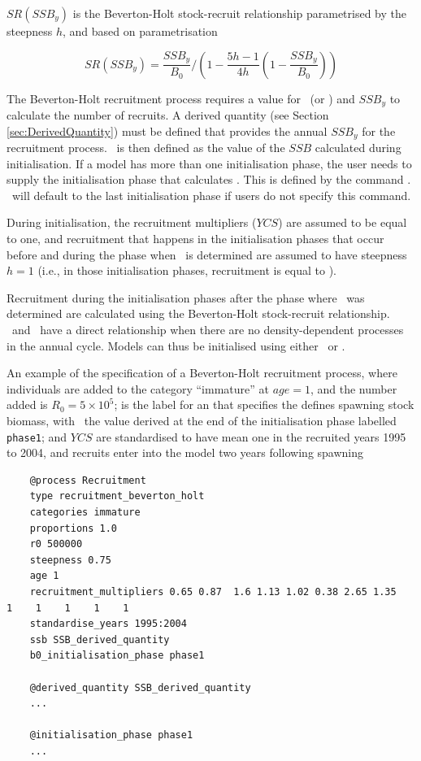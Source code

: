 $SR(SSB_y)$ is the Beverton-Holt stock-recruit relationship parametrised by the steepness $h$, and based on \cite{mace_doonan_88} parametrisation

\begin{equation}\label{eq:BH_SR}
SR(SSB_y) = \frac{SSB_y}{B_0} / \left( 1-\frac{5h-1}{4h} \left( 1-\frac{SSB_y}{B_0} \right) \right)
\end{equation}

The Beverton-Holt recruitment process requires a value for \Bzero\ (or \Rzero) and $SSB_y$ to calculate the number of recruits. A derived quantity (see Section \ref{sec:DerivedQuantity}) must be defined that provides the annual $SSB_y$ for the recruitment process. \Bzero\ is then defined as the value of the $SSB$ calculated during initialisation. If a model has more than one initialisation phase, the user needs to supply the initialisation phase that calculates \Bzero. This is defined by the command . \CNAME\ will default to the last initialisation phase if users do not specify this command.

During initialisation, the recruitment multipliers ($YCS$) are assumed to be equal to one, and recruitment that happens in the initialisation phases that occur before and during the phase when \Bzero\ is determined are assumed to have steepness $h=1$ (i.e., in those initialisation phases, recruitment is equal to \Rzero).

Recruitment during the initialisation phases after the phase where \Bzero\ was determined are calculated using the Beverton-Holt stock-recruit relationship. \Rzero\ and \Bzero\ have a direct relationship when there are no density-dependent processes in the annual cycle. Models can thus be initialised using either \Bzero\ or \Rzero.

An example of the specification of a Beverton-Holt recruitment process, where individuals are added to the category \enquote{immature} at $age=1$, and the number added is $R_0=5 \times 10^5$;  is the label for an  that specifies the defines spawning stock biomass, with \Bzero\ the value derived at the end of the initialisation phase labelled \texttt{phase1}; and $YCS$ are standardised to have mean one in the recruited years 1995 to 2004, and recruits enter into the model two years following spawning

{\small{\begin{verbatim}
	@process Recruitment
	type recruitment_beverton_holt
	categories immature
	proportions 1.0
	r0 500000
	steepness 0.75
	age 1
	recruitment_multipliers 0.65 0.87  1.6 1.13 1.02 0.38 2.65 1.35    1    1    1    1    1
	standardise_years 1995:2004
	ssb SSB_derived_quantity
	b0_initialisation_phase phase1
	
	@derived_quantity SSB_derived_quantity
	...
	
	@initialisation_phase phase1
	...
\end{verbatim}}}

